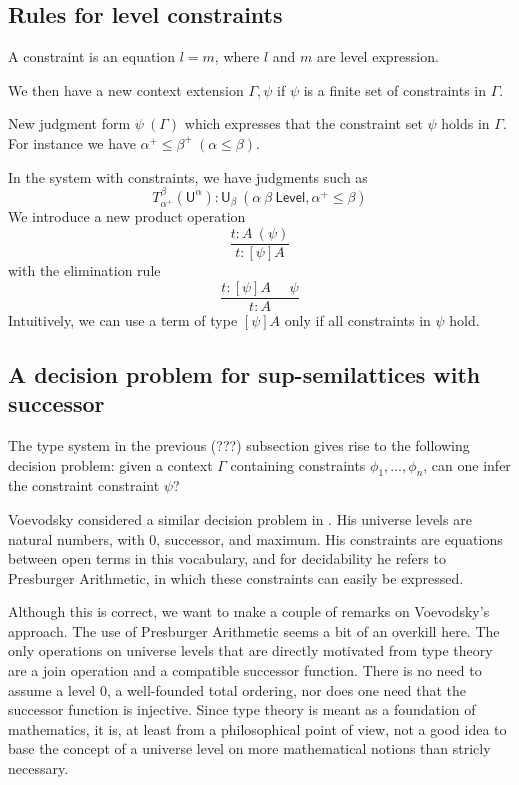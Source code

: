\documentclass[11pt,a4paper]{article}
\def\UU{\mathsf{U}}
\def\Level{\mathsf{Level}}
\def\Constraint{\mathsf{Constraint}}
\begin{document}
\subsection{Rules for level constraints}%

A constraint is an equation $l = m$, where $l$ and $m$ are level expression. 

We then have a new context extension $\Gamma,\psi$ if $\psi$ is a finite set of constraints in $\Gamma$.

New judgment form $\psi~(\Gamma)$ which expresses that the constraint set $\psi$
holds in $\Gamma$. For instance we have $\alpha^+\leqslant\beta^+~(\alpha\leqslant\beta)$.

In the system with constraints, we have judgments such as
$$
T_{\alpha^+}^{\beta}(\UU^{\alpha}):\UU_{\beta}~(\alpha~\beta~\Level,\alpha^+\leqslant\beta)
$$
We introduce a new product operation
$$
\frac{t:A~(\psi)}{t:[\psi]A}
$$
with the elimination rule
$$
\frac{t:[\psi]A~~~~~~\psi}{t:A}
$$
Intuitively, we can use a term of type $[\psi]A$ only if all constraints in $\psi$ hold.

\subsection{A decision problem for sup-semilattices with successor}

The type system in the previous (???) subsection gives rise to the following
decision problem: given a context $\Gamma$ containing constraints $\phi_1,\ldots,\phi_n$,
can one infer the constraint constraint $\psi$?

Voevodsky considered a similar decision problem in \cite[Section 2]{VV}. 
His universe levels are natural numbers, with 0, successor, and maximum.
His constraints are equations between open terms in this vocabulary, 
and for decidability he refers to Presburger Arithmetic,
in which these constraints can easily be expressed.

Although this is correct, we want to make a couple of remarks on Voevodsky's approach.
The use of Presburger Arithmetic seems a bit of an overkill here.
The only operations on universe levels that are directly motivated
from type theory are a join operation and a compatible successor function.
There is no need to assume a level 0, a well-founded total ordering,
nor does one need that the successor function is injective.
Since type theory is meant as a foundation of mathematics, it is,
at least from a philosophical point of view, 
not a good idea to base the concept of a universe level 
on more mathematical notions than stricly necessary.
\end{document}
